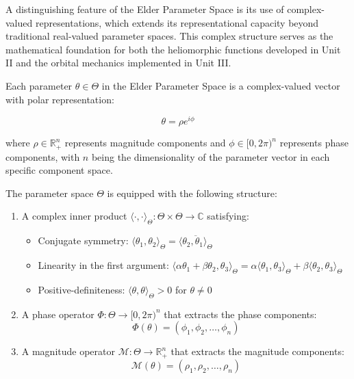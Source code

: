A distinguishing feature of the Elder Parameter Space is its use of complex-valued representations, which extends its representational capacity beyond traditional real-valued parameter spaces. This complex structure serves as the mathematical foundation for both the heliomorphic functions developed in Unit II and the orbital mechanics implemented in Unit III.

\begin{definition}
Each parameter $\theta \in \Theta$ in the Elder Parameter Space is a complex-valued vector with polar representation:

\begin{equation}
\theta = \rho e^{i\phi}
\end{equation}

where $\rho \in \mathbb{R}^n_+$ represents magnitude components and $\phi \in [0, 2\pi)^n$ represents phase components, with $n$ being the dimensionality of the parameter vector in each specific component space.

The parameter space $\Theta$ is equipped with the following structure:
\begin{enumerate}
    \item A complex inner product $\langle \cdot, \cdot \rangle_{\Theta}: \Theta \times \Theta \rightarrow \mathbb{C}$ satisfying:
    \begin{itemize}
        \item Conjugate symmetry: $\langle \theta_1, \theta_2 \rangle_{\Theta} = \overline{\langle \theta_2, \theta_1 \rangle_{\Theta}}$
        \item Linearity in the first argument: $\langle \alpha\theta_1 + \beta\theta_2, \theta_3 \rangle_{\Theta} = \alpha\langle \theta_1, \theta_3 \rangle_{\Theta} + \beta\langle \theta_2, \theta_3 \rangle_{\Theta}$
        \item Positive-definiteness: $\langle \theta, \theta \rangle_{\Theta} > 0$ for $\theta \neq 0$
    \end{itemize}
    
    \item A phase operator $\Phi: \Theta \rightarrow [0, 2\pi)^n$ that extracts the phase components:
    \begin{equation}
    \Phi(\theta) = (\phi_1, \phi_2, \ldots, \phi_n)
    \end{equation}
    
    \item A magnitude operator $\mathcal{M}: \Theta \rightarrow \mathbb{R}^n_+$ that extracts the magnitude components:
    \begin{equation}
    \mathcal{M}(\theta) = (\rho_1, \rho_2, \ldots, \rho_n)
    \end{equation}
\end{enumerate}
\end{definition}

